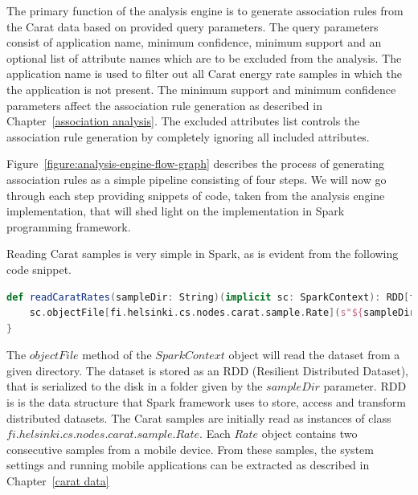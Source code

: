 The primary function of the analysis engine is to generate association rules from the Carat data based on provided query parameters. The query parameters consist of application name, minimum confidence, minimum support and an optional list of attribute names which are to be excluded from the analysis. The application name is used to filter out all Carat energy rate samples in which the the application is not present. The minimum support and minimum confidence parameters affect the association rule generation as described in Chapter~\ref{association analysis}. The excluded attributes list controls the association rule generation by completely ignoring all included attributes.    

 
Figure~\ref{figure:analysis-engine-flow-graph} describes the process of generating association rules as a simple pipeline consisting of four steps. We will now go through each step providing snippets of code, taken from the analysis engine implementation, that will shed light on the implementation in Spark programming framework. 

Reading Carat samples is very simple in Spark, as is evident from the following code snippet.  

\begin{minipage}{0.95\linewidth}
\begin{lstlisting}[language=scala]
def readCaratRates(sampleDir: String)(implicit sc: SparkContext): RDD[fi.helsinki.cs.nodes.carat.sample.Rate] = {
	sc.objectFile[fi.helsinki.cs.nodes.carat.sample.Rate](s"${sampleDir}")
}
\end{lstlisting}
\end{minipage}

The $objectFile$ method of the $SparkContext$ object will read the dataset from a given directory. The dataset is stored as an RDD (Resilient Distributed Dataset), that is serialized to the disk in a folder given by the $sampleDir$ parameter. RDD is is the data structure that Spark framework uses to store, access and transform distributed datasets. The Carat samples are initially read as instances of class $fi.helsinki.cs.nodes.carat.sample.Rate$. Each $Rate$ object contains two consecutive samples from a mobile device. From these samples, the system settings and running mobile applications can be extracted as described in Chapter~\ref{carat data}  

